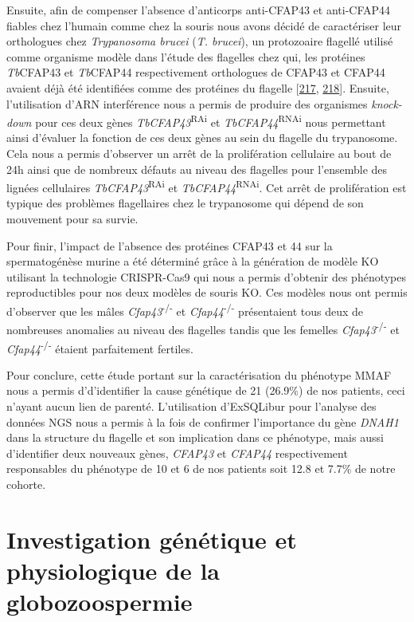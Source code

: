 \documentclass[12pt,a4paper,twoside]{ugathesis}
\theoremstyle{definition}
\theoremstyle{definition}
\theoremstyle{definition}
\theoremstyle{remark}
\begin{document}
Ensuite, afin de compenser l'absence d'anticorps anti-CFAP43 et
anti-CFAP44 fiables chez l'humain comme chez la souris nous avons décidé
de caractériser leur orthologues chez \emph{Trypanosoma brucei}
(\emph{T. brucei}), un protozoaire flagellé utilisé comme organisme
modèle dans l'étude des flagelles chez qui, les protéines
\emph{Tb}CFAP43 et \emph{Tb}CFAP44 respectivement orthologues de CFAP43
et CFAP44 avaient déjà été identifiées comme des protéines du flagelle
{[}\protect\hyperlink{ref-Broadhead2006}{217},
\protect\hyperlink{ref-Subota2014}{218}{]}. Ensuite, l'utilisation d'ARN
interférence nous a permis de produire des organismes \emph{knock-down}
pour ces deux gènes \emph{TbCFAP43}\textsuperscript{RAi} et
\emph{TbCFAP44}\textsuperscript{RNAi} nous permettant ainsi d'évaluer la
fonction de ces deux gènes au sein du flagelle du trypanosome. Cela nous
a permis d'observer un arrêt de la prolifération cellulaire au bout de
24h ainsi que de nombreux défauts au niveau des flagelles pour
l'ensemble des lignées cellulaires \emph{TbCFAP43}\textsuperscript{RAi}
et \emph{TbCFAP44}\textsuperscript{RNAi}. Cet arrêt de prolifération est
typique des problèmes flagellaires chez le trypanosome qui dépend de son
mouvement pour sa survie.

Pour finir, l'impact de l'absence des protéines CFAP43 et 44 sur la
spermatogénèse murine a été déterminé grâce à la génération de modèle KO
utilisant la technologie CRISPR-Cas9 qui nous a permis d'obtenir des
phénotypes reproductibles pour nos deux modèles de souris KO. Ces
modèles nous ont permis d'observer que les mâles
\emph{Cfap43}\textsuperscript{-/-} et \emph{Cfap44}\textsuperscript{-/-}
présentaient tous deux de nombreuses anomalies au niveau des flagelles
tandis que les femelles \emph{Cfap43}\textsuperscript{-/-} et
\emph{Cfap44}\textsuperscript{-/-} étaient parfaitement fertiles.

Pour conclure, cette étude portant sur la caractérisation du phénotype
MMAF nous a permis d'd'identifier la cause génétique de 21 (26.9\%) de
nos patients, ceci n'ayant aucun lien de parenté. L'utilisation
d'ExSQLibur pour l'analyse des données NGS nous a permis à la fois de
confirmer l'importance du gène \emph{DNAH1} dans la structure du
flagelle et son implication dans ce phénotype, mais aussi d'identifier
deux nouveaux gènes, \emph{CFAP43} et \emph{CFAP44} respectivement
responsables du phénotype de 10 et 6 de nos patients soit 12.8 et 7.7\%
de notre cohorte.

\hypertarget{globo}{\chapter{Investigation génétique et physiologique de
la globozoospermie}\label{globo}}
\end{document}
